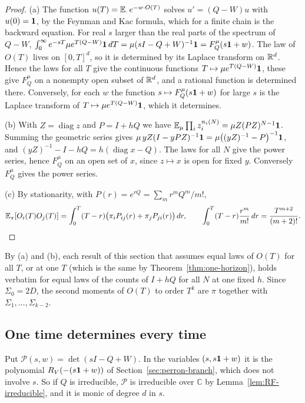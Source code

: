 \begin{proof}
(a) The function $u(T)=\mathbb{E}_\cdot\,e^{-w\cdot O(T)}$ solves $u'=(Q-W)u$ with $u(0)=\mathbf{1}$, by the
Feynman and Kac formula, which for a finite chain is the backward equation. For real $s$ larger
than the real parts of the spectrum of $Q-W$,
$\int_0^\infty e^{-sT}\mu e^{T(Q-W)}\mathbf{1}\,dT=\mu(sI-Q+W)^{-1}\mathbf{1}=F^\mu_Q(s\mathbf{1}+w)$. The law of
$O(T)$ lives on $[0,T]^d$, so it is determined by its Laplace transform on $\mathbb{R}^d$. Hence the laws
for all $T$ give the continuous functions $T\mapsto\mu e^{T(Q-W)}\mathbf{1}$, these give $F^\mu_Q$ on
a nonempty open subset of $\mathbb{R}^d$, and a rational function is determined there. Conversely, for each
$w$ the function $s\mapsto F^\mu_Q(s\mathbf{1}+w)$ for large $s$ is the Laplace transform of
$T\mapsto\mu e^{T(Q-W)}\mathbf{1}$, which it determines.

(b) With $Z=\operatorname{diag}z$ and $P=I+hQ$ we have $\mathbb{E}_\mu\prod_iz_i^{n_i(N)}=\mu Z(PZ)^{N-1}\mathbf{1}$.
Summing the geometric series gives $\mu\,yZ(I-yPZ)^{-1}\mathbf{1}=\mu\bigl((yZ)^{-1}-P\bigr)^{-1}\mathbf{1}$,
and $(yZ)^{-1}-I-hQ=h(\operatorname{diag}x-Q)$. The laws for all $N$ give the power series, hence
$F^\mu_Q$ on an open set of $x$, since $z\mapsto x$ is open for fixed $y$. Conversely $F^\mu_Q$ gives
the power series.

(c) By stationarity, with $P(r)=e^{rQ}=\sum_mr^mQ^m/m!$,
\[
 \mathbb{E}_\pi[O_i(T)O_j(T)]=\int_0^T(T-r)\bigl(\pi_iP_{ij}(r)+\pi_jP_{ji}(r)\bigr)\,dr,\qquad
 \int_0^T(T-r)\frac{r^m}{m!}\,dr=\frac{T^{m+2}}{(m+2)!}. \qedhere
\]
\end{proof}

By (a) and (b), each result of this section that assumes equal laws of $O(T)$ for all $T$, or at
one $T$ (which is the same by Theorem~\ref{thm:one-horizon}), holds verbatim for equal laws of
the counts of $I+hQ$ for all $N$ at one fixed $h$. Since $\Sigma_0=2D$, the second moments of
$O(T)$ to order $T^k$ are $\pi$ together with $\Sigma_1,\dots,\Sigma_{k-2}$.

\subsection{One time determines every time}\label{sec:law-one-time}

Put $\mathcal P(s,w)=\det(sI-Q+W)$. In the variables $(s,s\mathbf{1}+w)$ it is the polynomial
$R_V(-(s\mathbf{1}+w))$ of Section~\ref{sec:perron-branch}, which does not involve $s$. So if $Q$ is
irreducible, $\mathcal P$ is irreducible over $\mathbb C$ by Lemma~\ref{lem:RF-irreducible}, and it
is monic of degree $d$ in $s$.

